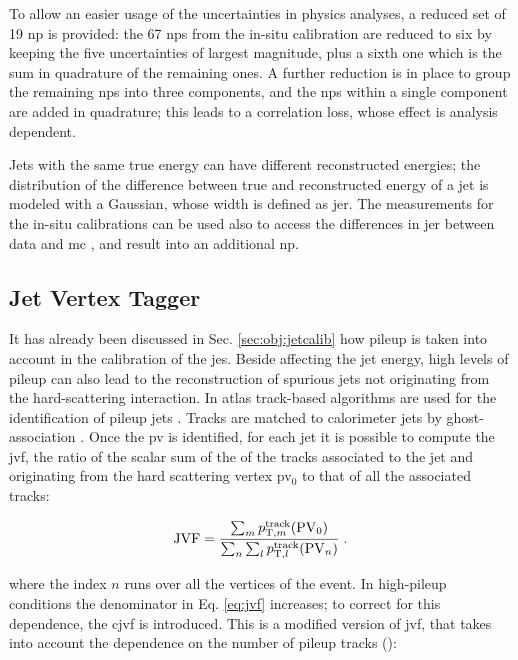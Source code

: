 To allow an easier usage of the uncertainties in physics analyses, a reduced set of 19 \gls{np} is provided: 
the 67 \glspl{np} from the in-situ calibration are reduced to six by keeping the five uncertainties of largest magnitude, 
plus a sixth one which is the sum in quadrature of the remaining ones. 
A further reduction is in place to group the remaining \glspl{np} into three components, 
and the \glspl{np} within a single component are added in quadrature; this leads to a correlation loss, whose effect is analysis dependent. 

Jets with the same true energy can have different reconstructed energies; the distribution of the difference between true and reconstructed energy of a jet is modeled with a Gaussian, whose width is defined as \gls{jer}. The measurements for the in-situ calibrations can be used also to access the differences in \gls{jer} between data and \gls{mc} \cite{TheATLAScollaboration:2015ofv,ATLAS:2015uwa}, and result into an additional \gls{np}.

\subsection{Jet Vertex Tagger}

It has already been discussed in Sec. \ref{sec:obj:jetcalib} how pileup is taken into account in the calibration of the \gls{jes}. Beside affecting the jet energy, high levels of pileup can also lead to the reconstruction of spurious jets not originating from the hard-scattering interaction. In \gls{atlas} track-based algorithms are used for the identification of pileup jets \cite{Aad:2015ina,ATLAS:2014cva}. 
Tracks are matched to calorimeter jets by ghost-association \cite{Soyez:2012hv}. Once the \gls{pv} is identified, 
for each jet it is possible to compute the \gls{jvf}, the ratio of the scalar sum of the \pt of the tracks associated to the jet and originating from the hard scattering vertex \gls{pv}$_0$ to that of all the associated tracks:

\begin{equation}
 {\rm JVF} = \frac{\sum_m{p_{{\rm T}, m}^{{\rm track}}({\rm PV}_0)}}{\sum_n\sum_l  p_{{\rm T}, l}^{{\rm track}}({\rm PV}_n)} \; .
 \label{eq:jvf}
\end{equation} 

\noindent where the index $n$ runs over all the vertices of the event. In high-pileup conditions the denominator in 
Eq. \ref{eq:jvf} increases; to correct for this dependence, the \gls{cjvf} is introduced. 
This is a modified version of \gls{jvf}, that takes into account the dependence on the number of pileup tracks (\nPUtrk):

